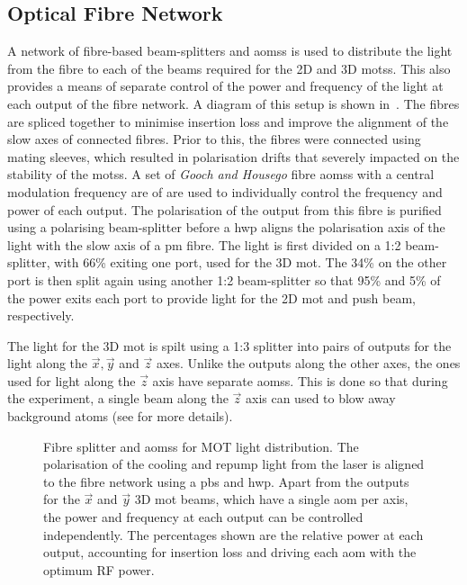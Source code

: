 \subsection{Optical Fibre Network}
A network of fibre-based beam-splitters and \acp{aoms} is used to distribute the
light from the \Muquans fibre to each of the beams required for the 2D and 3D
\acp{mots}. This also provides a means of separate control of the power and
frequency of the light at each output of the fibre network. A diagram of this
setup is shown in~. The fibres are spliced together
to minimise insertion loss and improve the alignment of the slow axes of
connected fibres. Prior to this, the fibres were connected using mating sleeves,
which resulted in polarisation drifts that severely impacted on the stability of
the \acp{mots}. A set of \textit{Gooch and Housego} fibre \acp{aoms} with a
central modulation frequency are of  are used to
individually control the frequency and power of each output. The polarisation of
the output from this fibre is purified using a polarising beam-splitter before a
\ac{hwp} aligns the polarisation axis of the light with the slow axis of a
\ac{pm} fibre. The light is first divided on a 1:2 beam-splitter, with 66\%
exiting one port, used for the 3D \ac{mot}. The 34\% on the other port is then
split again using another 1:2 beam-splitter so that 95\% and 5\% of the power
exits each port to provide light for the 2D \ac{mot} and push beam,
respectively. \par\noindent The light for the 3D \ac{mot} is spilt using a 1:3
splitter into pairs of outputs for the light along the \(\vec{x},\vec{y}\) and
\(\vec{z}\) axes. Unlike the outputs along the other axes, the ones used for
light along the \(\vec{z}\) axis have separate \acp{aoms}. This is done so that
during the experiment, a single beam along the \(\vec{z}\) axis can used to blow
away background atoms (see  for more details).

\begin{figure}
	\centering
	\def\svgwidth{0.65\textwidth}
	\small{}
	\caption[Network of optical fibre splitters and \acp{aoms} for \ac{MOT}light distribution]{Fibre splitter and \acp{aoms} for \ac{MOT} light distribution. The polarisation of the cooling and repump light from the \Muquans laser is aligned to the fibre network using a \ac{pbs} and \ac{hwp}. Apart from the outputs for the \(\vec{x}\) and \(\vec{y}\) 3D \ac{mot} beams, which have a single \ac{aom} per axis, the power and frequency at each output can be controlled independently. The percentages shown are the relative power at each output, accounting for insertion loss and driving each \ac{aom} with the optimum RF power.}
	\label{fig:fibre_network}
\end{figure}
